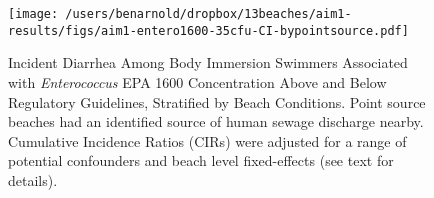 \documentclass[11pt]{article}
\begin{document}
\begin{figure}[htbp]
\begin{center}
\texttt{[image: /users/benarnold/dropbox/13beaches/aim1-results/figs/aim1-entero1600-35cfu-CI-bypointsource.pdf]} 
\begin{minipage}{\textwidth}
\caption{Incident Diarrhea Among Body Immersion Swimmers Associated with \textit{Enterococcus} EPA 1600 Concentration Above and Below Regulatory Guidelines, Stratified by Beach Conditions. Point source beaches had an identified source of human sewage discharge nearby. Cumulative Incidence Ratios (CIRs) were adjusted for a range of potential confounders and beach level fixed-effects (see text for details).}
\label{fig:enteroregulatory}
\end{minipage}
\end{center}
\end{figure}
\end{document}
